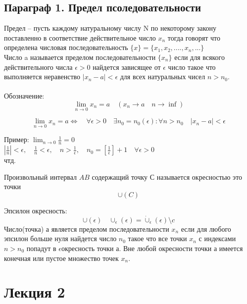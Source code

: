 \documentclass[a4paper, 12pt]{article}
\begin{document}
\subsection{Параграф 1. Предел псоледовательности}
Предел -- пусть каждому натуральному числу N по некоторому закону поставленно в соответствие действительное число $ x_n $ тогда говорят что определена числовая последовательность $ \{x\} = \{x_1,x_2,....,x_n,...\} $ \\
Число a называется пределом последовательности $ \{x_n\}  $ если для всякого действительного числа $ \epsilon  > 0$ найдется зависящее от $ \epsilon $ число такое что выполняется неравенство $ |x_n - a| < \epsilon  $ для всех натуральных чисел $ n > n_0 $.  \\
\\Обозначение:\\
\[
	\lim_{n\to 0} x_n  = a \quad(x_n \to a \quad n \to \inf)	
\]
 
 \[
 	\lim_{n\to 0} x_n = a \Leftrightarrow  \quad \forall \epsilon > 0 \quad \exists n_0 = n_0(\epsilon): \forall n > n_0 \quad |x_n -a| < \epsilon
 \]
\begin{mdframed}[backgroundcolor=blue!20] 
       Пример: $  \lim_{n\to 0} \frac{1}{n}=0 $\\
       $|\frac{1}{n}| < \epsilon, \quad \frac{1}{n} < \epsilon, \quad n > \frac{1}{\epsilon}, \quad n_0 = \left[\frac{1}{\epsilon}\right] + 1 \quad \forall \epsilon>0 $\\
       чтд.
    \end{mdframed}
Произвольный интервал $ AB $ содержащий точку С называется окресностью это точки\\
\[
	\cup(C)	
\]

Эпсилон окресность:\\
\[
	\cup(\epsilon)	\quad {\cup_\epsilon}(\epsilon) = \dot\cup_\epsilon(\epsilon) \setminus {c}
\]
Число(точка) а является пределом последовательности $ x_n $
если для любого эпсилон больше нуля найдется число $ n_0 $ такое что все точки $ x_n $ с индексами $  n > n_0$ попадут в $ \epsilon $окресность точки а. Вне любой окресности точки а имеется конечная или пустое множество точек $ x_n $.


\section*{Лекция 2}
\end{document}
